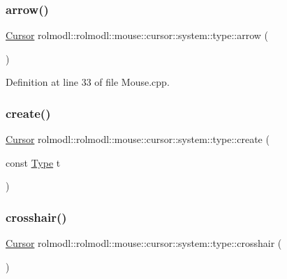 \subsubsection{\texorpdfstring{arrow()}{arrow()}}
{\footnotesize\ttfamily \mbox{\hyperlink{classrolmodl_1_1rolmodl_1_1mouse_1_1_cursor}{Cursor}} rolmodl\+::rolmodl\+::mouse\+::cursor\+::system\+::type\+::arrow (\begin{DoxyParamCaption}{ }\end{DoxyParamCaption})}



Definition at line 33 of file Mouse.\+cpp.

\mbox{\label{namespacerolmodl_1_1rolmodl_1_1mouse_1_1cursor_1_1system_1_1type_a2e49abb9f0f64680c857873a70f8c345}} 
\subsubsection{\texorpdfstring{create()}{create()}}
{\footnotesize\ttfamily \mbox{\hyperlink{classrolmodl_1_1rolmodl_1_1mouse_1_1_cursor}{Cursor}} rolmodl\+::rolmodl\+::mouse\+::cursor\+::system\+::type\+::create (\begin{DoxyParamCaption}\item[{const \mbox{\hyperlink{namespacerolmodl_1_1rolmodl_1_1mouse_1_1cursor_1_1system_a3446a710acf989c6fbce2397d43d6a33}{Type}}}]{t }\end{DoxyParamCaption})}

\mbox{\label{namespacerolmodl_1_1rolmodl_1_1mouse_1_1cursor_1_1system_1_1type_a60c6dc9b1154960d8d8dc09bbc118c00}} 
\subsubsection{\texorpdfstring{crosshair()}{crosshair()}}
{\footnotesize\ttfamily \mbox{\hyperlink{classrolmodl_1_1rolmodl_1_1mouse_1_1_cursor}{Cursor}} rolmodl\+::rolmodl\+::mouse\+::cursor\+::system\+::type\+::crosshair (\begin{DoxyParamCaption}{ }\end{DoxyParamCaption})}



